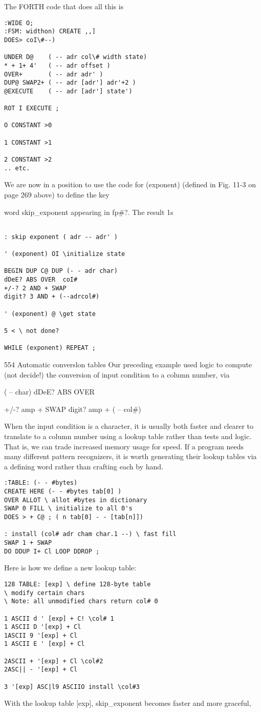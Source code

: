 The FORTH code that does all this is
\begin{verbatim}
:WIDE O;
:FSM: widthon) CREATE ,,]
DOES> coI\#--)

UNDER D@    ( -- adr col\# width state)
* + 1+ 4'   ( -- adr offset )
OVER+       ( -- adr adr' )
DUP@ SWAP2+ ( -- adr [adr'] adr'+2 )
@EXECUTE    ( -- adr [adr'] state')

ROT I EXECUTE ;

O CONSTANT >0

1 CONSTANT >1

2 CONSTANT >2
.. etc.

\end{verbatim}

We are now in a position to use the code for (exponent)
(defined in Fig. 11-3 on page 269 above) to define the key

word skip\_exponent appearing in fp\#?. The result 1s

\begin{verbatim}

: skip exponent ( adr -- adr' )

' (exponent) OI \initialize state

BEGIN DUP C@ DUP (- - adr char)
dDeE? ABS OVER  coI#
+/-? 2 AND + SWAP
digit? 3 AND + (--adrcol#)

' (exponent) @ \get state

5 < \ not done?

WHILE (exponent) REPEAT ;
\end{verbatim}
554 Automatic converslon tables
Our preceding example used logic to compute (not decide!) the
conversion of input condition to a column number, via

( -- char) dDeE? ABS OVER

+/-? amp + SWAP
digit? amp + ( -- col\#)


When the input condition is a character, it is usually both faster
and clearer to translate to a column number using a lookup table
rather than tests and logic. That is, we can trade increased
memory usage for speed. If a program needs many different
pattern recognizers, it is worth generating their lookup tables via
a defining word rather than crafting each by hand.
\begin{verbatim}
:TABLE: (- - #bytes)
CREATE HERE (- - #bytes tab[0] )
OVER ALLOT \ allot #bytes in dictionary
SWAP 0 FILL \ initialize to all 0's
DOES > + C@ ; ( n tab[0] - - [tab[n]])

: install (col# adr cham char.1 --) \ fast fill
SWAP 1 + SWAP
DO DDUP I+ Cl LOOP DDROP ;
\end{verbatim}
Here is how we define a new lookup table:
\begin{verbatim}
128 TABLE: [exp] \ define 128-byte table
\ modify certain chars
\ Note: all unmodified chars return col# 0

1 ASCII d ' [exp] + C! \col# 1
1 ASCII D '[exp] + Cl
1ASCII 9 '[exp] + Cl
1 ASCII E ' [exp] + Cl

2ASCII + '[exp] + Cl \col#2
2ASC|| - '[exp] + Cl

3 '[exp] ASC|l9 ASCIIO install \col#3
\end{verbatim}
With the lookup table [exp], skip\_exponent becomes faster
and more graceful,

